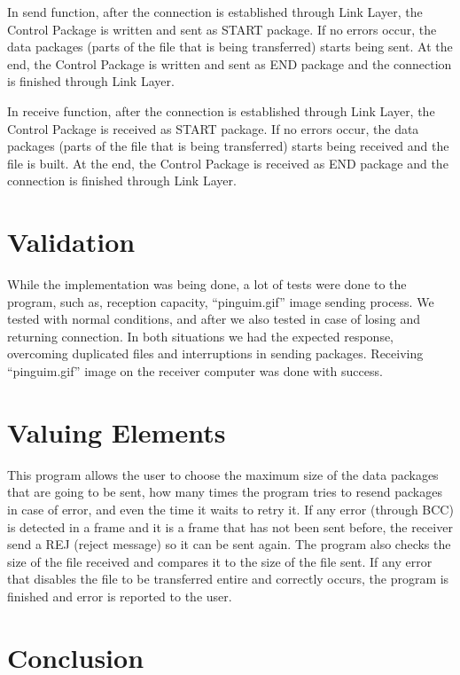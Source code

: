 \documentclass[a4paper]{article}
\begin{document}
In send function, after the connection is established through Link Layer, the Control Package is written and sent as START package. If no errors occur, the data packages (parts of the file that is being transferred) starts being sent. At the end, the Control Package is written and sent as END package and the connection is finished through Link Layer.

In receive function, after the connection is established through Link Layer, the Control Package is received as START package. If no errors occur, the data packages (parts of the file that is being transferred) starts being received and the file is built. At the end, the Control Package is received as END package and the connection is finished through Link Layer.

\section{Validation}

While the implementation was being done, a lot of tests were done to the program, such as, reception capacity, “pinguim.gif” image sending process. We tested with normal conditions, and after we also tested in case of losing and returning connection. In both situations we had the expected response, overcoming duplicated files and
interruptions in sending packages. Receiving “pinguim.gif” image on the receiver computer was done with success.

\section{Valuing Elements}

This program allows the user to choose the maximum size of the data packages that are going to be sent, how many times the program tries to resend packages in case of error, and even the time it waits to retry it. If any error (through BCC) is detected in a frame and it is a frame that has not been sent before, the receiver send a REJ (reject message) so it can be sent again. The program also checks the size of the file received and compares it to the size of the file sent. If any error that disables the file to be transferred entire and correctly occurs, the program is finished and error is reported to the user.

\section{Conclusion}
\end{document}
